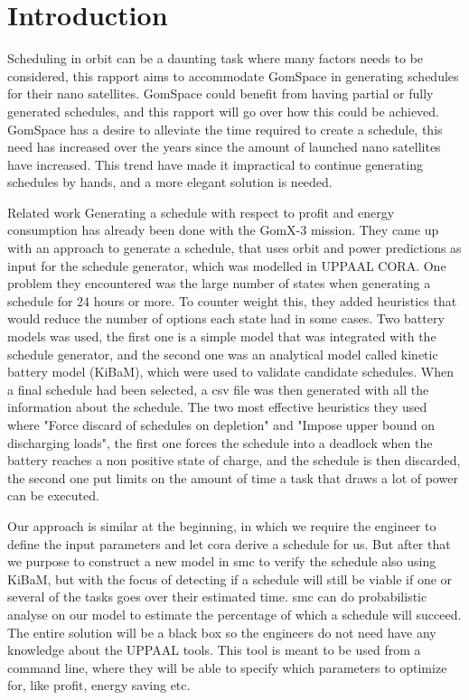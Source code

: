 \chapter{Introduction}\label{cha:intro}
Scheduling in orbit can be a daunting task where many factors needs to be considered, this rapport aims to accommodate GomSpace in generating schedules for their nano satellites. GomSpace could benefit from having partial or fully generated schedules, and this rapport will go over how this could be achieved. GomSpace has a desire to alleviate the time required to create a schedule, this need has increased over the years since the amount of launched nano satellites have increased. This trend have made it impractical to continue generating schedules by hands, and a more elegant solution is needed.

Related work %
Generating a schedule with respect to profit and energy consumption has already been done with the GomX-3 mission\cite{gomx3}. They came up with an approach to generate a schedule, that uses orbit and power predictions as input for the schedule generator, which was modelled in UPPAAL CORA. One problem they encountered was the large number of states when generating a schedule for 24 hours or more. To counter weight this, they added heuristics that would reduce the number of options each state had in some cases. Two battery models was used, the first one is a simple model that was integrated with the schedule generator, and the second one was an analytical model called kinetic battery model (KiBaM), which were used to validate candidate schedules. When a final schedule had been selected, a csv file was then generated with all the information about the schedule. The two most effective heuristics they used where "Force discard of schedules on depletion" and "Impose upper bound on discharging loads", the first one forces the schedule into a deadlock when the battery reaches a non positive state of charge, and the schedule is then discarded, the second one put limits on the amount of time a task that draws a lot of power can be executed\cite{gomx3}.

Our approach is similar at the beginning, in which we require the engineer to define the input parameters and let \gls{cora} derive a schedule for us. But after that we purpose to construct a new model in \gls{smc} to verify the schedule also using KiBaM, but with the focus of detecting if a schedule will still be viable if one or several of the tasks goes over their estimated time. \Gls{smc} can do probabilistic analyse on our model to estimate the percentage of which a schedule will succeed. The entire solution will be a black box so the engineers do not need have any knowledge about the UPPAAL tools. This tool is meant to be used from a command line, where they will be able to specify which parameters to optimize for, like profit, energy saving etc.



